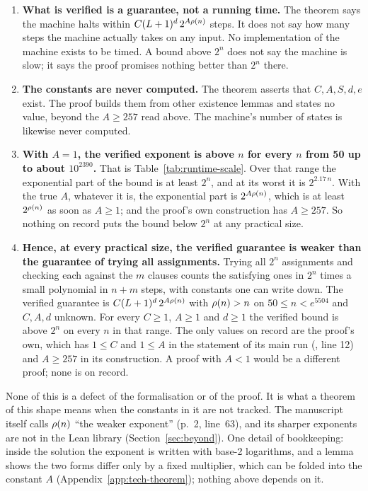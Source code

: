\begin{enumerate}
\item \textbf{What is verified is a guarantee, not a running time.} The
  theorem says the machine halts within $C(L+1)^d\,2^{A\rho(n)}$ steps.
  It does not say how many steps the machine actually takes on any
  input. No implementation of the machine exists to be timed. A bound
  above $2^n$ does not say the machine is slow; it says the proof
  promises nothing better than $2^n$ there.
\item \textbf{The constants are never computed.} The theorem asserts
  that $C, A, S, d, e$ exist. The proof builds them from other
  existence lemmas and states no value, beyond the $A \ge 257$ read
  above. The machine's number of states is likewise never computed.
\item \textbf{With $A = 1$, the verified exponent is above $n$ for every
  $n$ from 50 up to about $10^{2390}$.} That is
  Table~\ref{tab:runtime-scale}. Over that range the exponential part
  of the bound is at least $2^n$, and at its worst it is $2^{2.17\,n}$.
  With the true $A$, whatever it is, the exponential part is $2^{A\rho(n)}$,
  which is at least $2^{\rho(n)}$ as soon as $A \ge 1$; and the proof's
  own construction has $A \ge 257$. So nothing on record puts the bound
  below $2^n$ at any practical size.
\item \textbf{Hence, at every practical size, the verified guarantee is
  weaker than the guarantee of trying all assignments.} Trying all
  $2^n$ assignments and checking each against the $m$ clauses counts
  the satisfying ones in $2^n$ times a small polynomial in $n + m$
  steps, with constants one can write down. The verified guarantee is
  $C(L+1)^d\,2^{A\rho(n)}$ with $\rho(n) > n$ on $50 \le n < e^{5504}$ and
  $C, A, d$ unknown. For every $C \ge 1$, $A \ge 1$ and $d \ge 1$ the
  verified bound is above $2^n$ on every $n$ in that range. The only
  values on record are the proof's own, which has $1 \le C$ and
  $1 \le A$ in the statement of its main run
  (, line 12) and
  $A \ge 257$ in its construction. A proof with $A < 1$ would be a
  different proof; none is on record.
\end{enumerate}

None of this is a defect of the formalisation or of the proof. It is
what a theorem of this shape means when the constants in it are not
tracked. The manuscript itself calls $\rho(n)$ ``the weaker exponent''
(p.~2, line~63), and its sharper exponents are not in the Lean library
(Section~\ref{sec:beyond}). One detail of bookkeeping: inside the
solution the exponent is written with base-2 logarithms, and a lemma shows the two forms differ only by a fixed multiplier, which can be folded into the constant $A$ (Appendix~\ref{app:tech-theorem}); nothing above depends on it.

